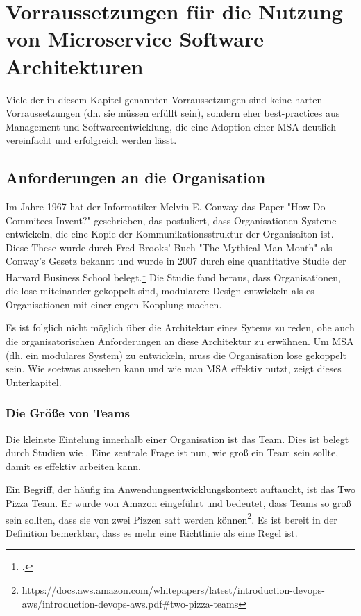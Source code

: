 \newpage
\section{Vorraussetzungen für die Nutzung von Microservice Software Architekturen} \label{wann-msa}

Viele der in diesem Kapitel genannten Vorraussetzungen sind keine harten
Vorraussetzungen (dh. sie müssen erfüllt sein), sondern eher best-practices aus
Management und Softwareentwicklung, die eine Adoption einer MSA deutlich
vereinfacht und erfolgreich werden lässt.

\subsection{Anforderungen an die Organisation}

Im Jahre 1967 hat der Informatiker Melvin E. Conway das Paper "How Do Commitees
Invent?" geschrieben, das postuliert, dass Organisationen Systeme entwickeln,
die eine Kopie der Kommunikationsstruktur der Organisaiton ist. Diese These
wurde durch Fred Brooks' Buch "The Mythical Man-Month" als Conway's Gesetz
bekannt und wurde in 2007 durch eine quantitative Studie der Harvard Business
School belegt.\footcite{MACCORMACK20121309} Die Studie fand heraus, dass
Organisationen, die lose miteinander gekoppelt sind, modularere Design
entwickeln als es Organisationen mit einer engen Kopplung machen.

Es ist folglich nicht möglich über die Architektur eines Sytems zu reden, ohe
auch die organisatorischen Anforderungen an diese Architektur zu erwähnen. Um
MSA (dh. ein modulares System) zu entwickeln, muss die Organisation lose
gekoppelt sein. Wie soetwas aussehen kann und wie man MSA effektiv nutzt, zeigt
dieses Unterkapitel.

\subsubsection{Die Größe von Teams}

Die kleinste Eintelung innerhalb einer Organisation ist das Team. Dies ist
belegt durch Studien wie \cite{doi:10.1177/001872089203400303}. Eine zentrale
Frage ist nun, wie groß ein Team sein sollte, damit es effektiv arbeiten kann.

Ein Begriff, der häufig im Anwendungsentwicklungskontext auftaucht, ist das Two
Pizza Team. Er wurde von Amazon eingeführt und bedeutet, dass Teams so groß sein
sollten, dass sie von zwei Pizzen satt werden
können\footnote{https://docs.aws.amazon.com/whitepapers/latest/introduction-devops-aws/introduction-devops-aws.pdf#two-pizza-teams}.
Es ist bereit in der Definition bemerkbar, dass es mehr eine Richtlinie als
eine Regel ist.


